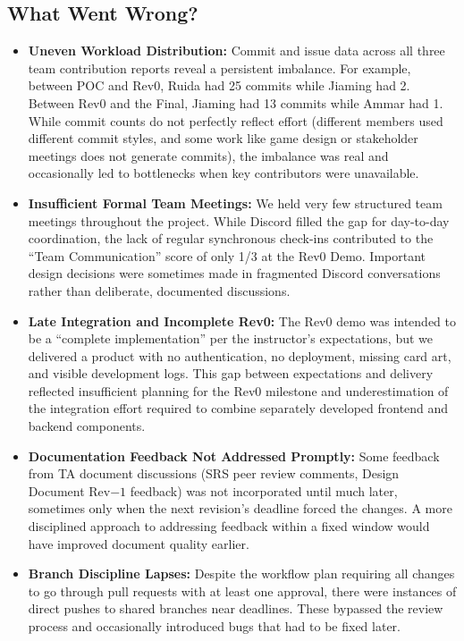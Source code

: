 \documentclass{article}
\begin{document}
\subsection{What Went Wrong?}

\begin{itemize}
  \item \textbf{Uneven Workload Distribution:} Commit and issue data across all three team contribution reports reveal a persistent imbalance. For example, between POC and Rev0, Ruida had 25 commits while Jiaming had 2. Between Rev0 and the Final, Jiaming had 13 commits while Ammar had 1. While commit counts do not perfectly reflect effort (different members used different commit styles, and some work like game design or stakeholder meetings does not generate commits), the imbalance was real and occasionally led to bottlenecks when key contributors were unavailable.

  \item \textbf{Insufficient Formal Team Meetings:} We held very few structured team meetings throughout the project. While Discord filled the gap for day-to-day coordination, the lack of regular synchronous check-ins contributed to the ``Team Communication'' score of only 1/3 at the Rev0 Demo. Important design decisions were sometimes made in fragmented Discord conversations rather than deliberate, documented discussions.

  \item \textbf{Late Integration and Incomplete Rev0:} The Rev0 demo was intended to be a ``complete implementation'' per the instructor's expectations, but we delivered a product with no authentication, no deployment, missing card art, and visible development logs. This gap between expectations and delivery reflected insufficient planning for the Rev0 milestone and underestimation of the integration effort required to combine separately developed frontend and backend components.

  \item \textbf{Documentation Feedback Not Addressed Promptly:} Some feedback from TA document discussions (SRS peer review comments, Design Document Rev$-1$ feedback) was not incorporated until much later, sometimes only when the next revision's deadline forced the changes. A more disciplined approach to addressing feedback within a fixed window would have improved document quality earlier.

  \item \textbf{Branch Discipline Lapses:} Despite the workflow plan requiring all changes to go through pull requests with at least one approval, there were instances of direct pushes to shared branches near deadlines. These bypassed the review process and occasionally introduced bugs that had to be fixed later.
\end{itemize}
\end{document}
